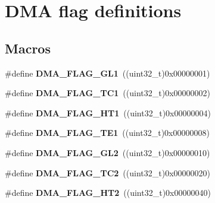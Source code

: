 \hypertarget{group___d_m_a__flag__definitions}{\section{D\-M\-A flag definitions}
\label{group___d_m_a__flag__definitions}
}
\subsection*{Macros}
\begin{DoxyCompactItemize}
\item 
\hypertarget{group___d_m_a__flag__definitions_ga56f71da03db3e0a5dfad8cdfe46eac5c}{\#define {\bfseries D\-M\-A\-\_\-\-F\-L\-A\-G\-\_\-\-G\-L1}~((uint32\-\_\-t)0x00000001)}\label{group___d_m_a__flag__definitions_ga56f71da03db3e0a5dfad8cdfe46eac5c}

\item 
\hypertarget{group___d_m_a__flag__definitions_ga02b6c752c28b35dba79fa1d2bb55ec06}{\#define {\bfseries D\-M\-A\-\_\-\-F\-L\-A\-G\-\_\-\-T\-C1}~((uint32\-\_\-t)0x00000002)}\label{group___d_m_a__flag__definitions_ga02b6c752c28b35dba79fa1d2bb55ec06}

\item 
\hypertarget{group___d_m_a__flag__definitions_ga4317f6260e1aecc4f5fe882fc043f606}{\#define {\bfseries D\-M\-A\-\_\-\-F\-L\-A\-G\-\_\-\-H\-T1}~((uint32\-\_\-t)0x00000004)}\label{group___d_m_a__flag__definitions_ga4317f6260e1aecc4f5fe882fc043f606}

\item 
\hypertarget{group___d_m_a__flag__definitions_ga198c0b4984a79514964d3dd5ae546008}{\#define {\bfseries D\-M\-A\-\_\-\-F\-L\-A\-G\-\_\-\-T\-E1}~((uint32\-\_\-t)0x00000008)}\label{group___d_m_a__flag__definitions_ga198c0b4984a79514964d3dd5ae546008}

\item 
\hypertarget{group___d_m_a__flag__definitions_ga1c8da546d95df14be19e9b82d0a49ecc}{\#define {\bfseries D\-M\-A\-\_\-\-F\-L\-A\-G\-\_\-\-G\-L2}~((uint32\-\_\-t)0x00000010)}\label{group___d_m_a__flag__definitions_ga1c8da546d95df14be19e9b82d0a49ecc}

\item 
\hypertarget{group___d_m_a__flag__definitions_gacdf2954f3faf8314811ed39272825ab0}{\#define {\bfseries D\-M\-A\-\_\-\-F\-L\-A\-G\-\_\-\-T\-C2}~((uint32\-\_\-t)0x00000020)}\label{group___d_m_a__flag__definitions_gacdf2954f3faf8314811ed39272825ab0}

\item 
\hypertarget{group___d_m_a__flag__definitions_gab21f437ec8a55a600e5ca2af9416baba}{\#define {\bfseries D\-M\-A\-\_\-\-F\-L\-A\-G\-\_\-\-H\-T2}~((uint32\-\_\-t)0x00000040)}\label{group___d_m_a__flag__definitions_gab21f437ec8a55a600e5ca2af9416baba}


\end{DoxyCompactItemize}
